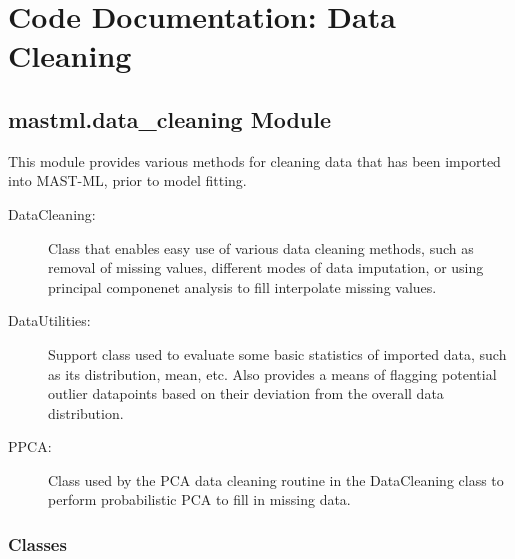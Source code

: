 \documentclass[letterpaper,10pt,english]{sphinxmanual}
\begin{document}
\chapter{Code Documentation: Data Cleaning}
\label{\detokenize{1_data_cleaning:code-documentation-data-cleaning}}\label{\detokenize{1_data_cleaning::doc}}

\section{mastml.data\_cleaning Module}
\label{\detokenize{1_data_cleaning:module-mastml.data_cleaning}}\label{\detokenize{1_data_cleaning:mastml-data-cleaning-module}}
This module provides various methods for cleaning data that has been imported into MAST-ML, prior to model fitting.
\begin{description}
\item[{DataCleaning:}] \leavevmode
Class that enables easy use of various data cleaning methods, such as removal of missing values, different
modes of data imputation, or using principal componenet analysis to fill interpolate missing values.

\item[{DataUtilities:}] \leavevmode
Support class used to evaluate some basic statistics of imported data, such as its distribution, mean, etc.
Also provides a means of flagging potential outlier datapoints based on their deviation from the overall data
distribution.

\item[{PPCA:}] \leavevmode
Class used by the PCA data cleaning routine in the DataCleaning class to perform probabilistic PCA to fill in
missing data.

\end{description}


\subsection{Classes}
\label{\detokenize{1_data_cleaning:classes}}
\end{document}
